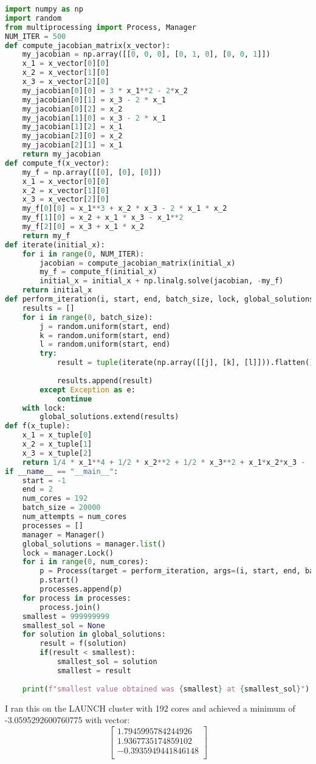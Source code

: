 \documentclass{article}
\begin{document}
\begin{lstlisting}[language=Python]
import numpy as np
import random
from multiprocessing import Process, Manager
NUM_ITER = 500
def compute_jacobian_matrix(x_vector):
    my_jacobian = np.array([[0, 0, 0], [0, 1, 0], [0, 0, 1]])
    x_1 = x_vector[0][0]
    x_2 = x_vector[1][0]
    x_3 = x_vector[2][0]
    my_jacobian[0][0] = 3 * x_1**2 - 2*x_2
    my_jacobian[0][1] = x_3 - 2 * x_1 
    my_jacobian[0][2] = x_2
    my_jacobian[1][0] = x_3 - 2 * x_1
    my_jacobian[1][2] = x_1
    my_jacobian[2][0] = x_2
    my_jacobian[2][1] = x_1
    return my_jacobian
def compute_f(x_vector):
    my_f = np.array([[0], [0], [0]])
    x_1 = x_vector[0][0]
    x_2 = x_vector[1][0]
    x_3 = x_vector[2][0]
    my_f[0][0] = x_1**3 + x_2 * x_3 - 2 * x_1 * x_2
    my_f[1][0] = x_2 + x_1 * x_3 - x_1**2
    my_f[2][0] = x_3 + x_1 * x_2
    return my_f
def iterate(initial_x):
    for i in range(0, NUM_ITER):
        jacobian = compute_jacobian_matrix(initial_x)
        my_f = compute_f(initial_x)
        initial_x = initial_x + np.linalg.solve(jacobian, -my_f)
    return initial_x
def perform_iteration(i, start, end, batch_size, lock, global_solutions):
    results = []
    for i in range(0, batch_size):
        j = random.uniform(start, end)
        k = random.uniform(start, end)
        l = random.uniform(start, end)
        try:
            result = tuple(iterate(np.array([[j], [k], [l]])).flatten())
            
            results.append(result)
        except Exception as e:
            continue
    with lock:
        global_solutions.extend(results)
def f(x_tuple):
    x_1 = x_tuple[0]
    x_2 = x_tuple[1]
    x_3 = x_tuple[2]
    return 1/4 * x_1**4 + 1/2 * x_2**2 + 1/2 * x_3**2 + x_1*x_2*x_3 - (x_1)**2 * x_2
if __name__ == "__main__":
    start = -1
    end = 2
    num_cores = 192
    batch_size = 20000
    num_attempts = num_cores
    processes = []
    manager = Manager()
    global_solutions = manager.list()
    lock = manager.Lock()
    for i in range(0, num_cores):
        p = Process(target = perform_iteration, args=(i, start, end, batch_size, lock, global_solutions))
        p.start()
        processes.append(p)
    for process in processes:
        process.join()
    smallest = 999999999
    smallest_sol = None
    for solution in global_solutions:
        result = f(solution)
        if(result < smallest):
            smallest_sol = solution
            smallest = result
    
    print(f"smallest value obtained was {smallest} at {smallest_sol}")
\end{lstlisting}
I ran this on the LAUNCH cluster with 192 cores and achieved a minimum of -3.0595292600760775 with vector: \\
\[\begin{bmatrix}
1.7945995784244926 \\
1.9367735174859102 \\
-0.3935949441846148 \\
\end{bmatrix}
\]
\end{document}
